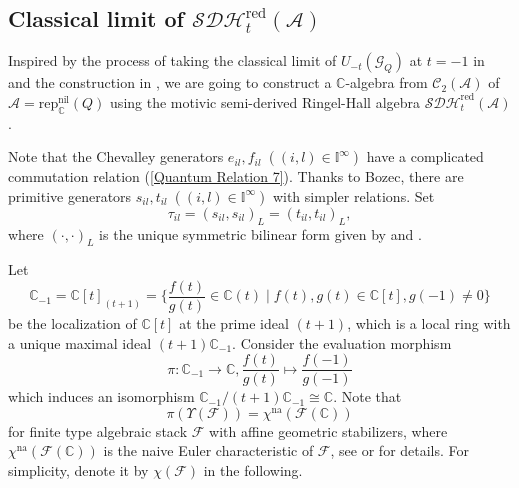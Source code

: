 \documentclass[12pt]{amsart}
\theoremstyle{definition}
\numberwithin{equation}{section}
\begin{document}
\subsection{Classical limit of \texorpdfstring{$ \mathcal{SDH}_t^{\mathrm{red}}(\mathcal{A}) $}{SDHtredA}}\;
\label{Classical limit of SDHt}

Inspired by the process of taking the classical limit of $ U_{-t}(\mathcal{G}_Q) $ at $ t=-1 $ in \cite{FKKB21} and the construction in \cite[Section 6.1]{FLX24}, we are going to construct a $ \mathbb{C} $-algebra from $ \mathcal{C}_2(\mathcal{A}) $ of $ \mathcal{A}= \mathrm{rep}^{\mathrm{nil}}_{\mathbb{C}}(Q) $ using the motivic semi-derived Ringel-Hall algebra $ \mathcal{SDH}_t^{\mathrm{red}}(\mathcal{A}) $.

Note that the Chevalley generators $ e_{il}, f_{il} \;((i,l) \in \mathbb{I}^{\infty}) $ have a complicated commutation relation (\ref{Quantum Relation 7}). 
Thanks to Bozec, there are primitive generators $ s_{il}, t_{il} \;((i,l) \in \mathbb{I}^{\infty}) $ with simpler relations. 
Set 
\[\tau_{il} = (s_{il},s_{il})_L = (t_{il},t_{il})_L ,\]
where $ (\cdot,\cdot)_L $ is the unique symmetric bilinear form given by \cite[Proposition 2.2]{Bozec15} and \cite[Proposition 3.2]{Bozec16}. 

Let \[\mathbb{C}_{-1} = \mathbb{C}[t]_{(t+1)} = \{\frac{f(t)}{g(t)} \in \mathbb{C}(t) \mid f(t),g(t) \in \mathbb{C}[t],g(-1) \neq 0 \}\] be the localization of $ \mathbb{C}[t] $ at the prime ideal $ (t+1) $, which is a local ring with a unique maximal ideal $ (t+1)\mathbb{C}_{-1}  $. 
Consider the evaluation morphism
\[\pi: \mathbb{C}_{-1} \to \mathbb{C}, \frac{f(t)}{g(t)} \mapsto \frac{f(-1)}{g(-1)}\]
which induces an isomorphism $ \mathbb{C}_{-1}/(t+1)\mathbb{C}_{-1} \cong \mathbb{C} $. 
Note that  \[ \pi (\Upsilon(\mathcal{F})) = \chi^{\mathrm{na}}(\mathcal{F}(\mathbb{C}))\]
for finite type algebraic stack $ \mathcal{F} $ with affine geometric stabilizers, where $ \chi^{\mathrm{na}}(\mathcal{F}(\mathbb{C})) $ is the naive Euler characteristic of $ \mathcal{F} $, see \cite[Section 5.1] {FLX24} or \cite[Example 2.12]{Joyce07} for details. 
For simplicity, denote it by $ \chi(\mathcal{F}) $ in the following.
\end{document}
